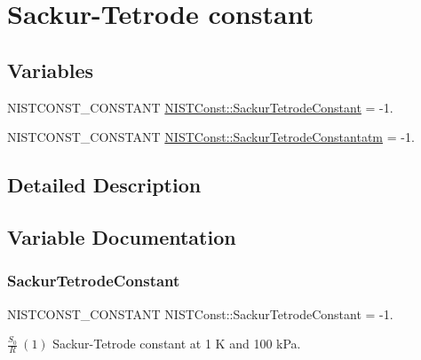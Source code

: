 \hypertarget{group___n_i_s_t_const-_sackur_tetrode_constant}{}\section{Sackur-\/\+Tetrode constant}
\label{group___n_i_s_t_const-_sackur_tetrode_constant}
\subsection*{Variables}
\begin{DoxyCompactItemize}
\item 
N\+I\+S\+T\+C\+O\+N\+S\+T\+\_\+\+C\+O\+N\+S\+T\+A\+NT \mbox{\hyperlink{group___n_i_s_t_const-_sackur_tetrode_constant_ga855d127fef012cffe2ffe38cdb1b61fa}{N\+I\+S\+T\+Const\+::\+Sackur\+Tetrode\+Constant}} = -\/1.
\item 
N\+I\+S\+T\+C\+O\+N\+S\+T\+\_\+\+C\+O\+N\+S\+T\+A\+NT \mbox{\hyperlink{group___n_i_s_t_const-_sackur_tetrode_constant_ga7f3efde326ea5cfe5e2d85d81a92fb3b}{N\+I\+S\+T\+Const\+::\+Sackur\+Tetrode\+Constantatm}} = -\/1.
\end{DoxyCompactItemize}


\subsection{Detailed Description}


\subsection{Variable Documentation}
\mbox{\label{group___n_i_s_t_const-_sackur_tetrode_constant_ga855d127fef012cffe2ffe38cdb1b61fa}} 
\subsubsection{\texorpdfstring{Sackur\+Tetrode\+Constant}{SackurTetrodeConstant}}
{\footnotesize\ttfamily N\+I\+S\+T\+C\+O\+N\+S\+T\+\_\+\+C\+O\+N\+S\+T\+A\+NT N\+I\+S\+T\+Const\+::\+Sackur\+Tetrode\+Constant = -\/1.}

$\frac{S_0}{R} \ (1)$ Sackur-\/\+Tetrode constant at 1 K and 100 k\+Pa. \mbox{\label{group___n_i_s_t_const-_sackur_tetrode_constant_ga7f3efde326ea5cfe5e2d85d81a92fb3b}} 
